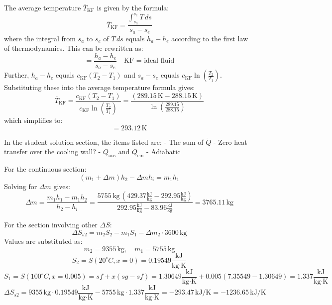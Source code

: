 The average temperature \( \overline{T}_{\text{KF}} \) is given by the formula:
\[
\overline{T}_{\text{KF}} = \frac{\int_{s_a}^{s_e} T \, ds}{s_a - s_e}
\]
where the integral from \( s_a \) to \( s_e \) of \( T \, ds \) equals \( h_a - h_e \) according to the first law of thermodynamics. This can be rewritten as:
\[
= \frac{h_a - h_e}{s_a - s_e} \quad \text{KF = ideal fluid}
\]
Further, \( h_a - h_e \) equals \( c_{\text{KF}} (T_2 - T_1) \) and \( s_a - s_e \) equals \( c_{\text{KF}} \ln \left( \frac{T_2}{T_1} \right) \). Substituting these into the average temperature formula gives:
\[
\overline{T}_{\text{KF}} = \frac{c_{\text{KF}} (T_2 - T_1)}{c_{\text{KF}} \ln \left( \frac{T_2}{T_1} \right)} = \frac{(289.15 \, \text{K} - 288.15 \, \text{K})}{\ln \left( \frac{289.15}{288.15} \right)}
\]
which simplifies to:
\[
= 293.12 \, \text{K}
\]

In the student solution section, the items listed are:
- The sum of \( \dot{Q} \)
- Zero heat transfer over the cooling wall?
- \( \dot{Q}_{\text{aus}} \) and \( \dot{Q}_{\text{ein}} \)
- Adiabatic

For the continuous section:
\[
(m_1 + \Delta m) h_2 - \Delta m h_i = m_1 h_1
\]
Solving for \( \Delta m \) gives:
\[
\Delta m = \frac{m_1 h_1 - m_1 h_2}{h_2 - h_i} = \frac{5755 \, \text{kg} \, (429.37 \frac{\text{kJ}}{\text{kg}} - 292.95 \frac{\text{kJ}}{\text{kg}})}{292.95 \frac{\text{kJ}}{\text{kg}} - 83.96 \frac{\text{kJ}}{\text{kg}}} = 3765.11 \, \text{kg}
\]

For the section involving other \( \Delta S \):
\[
\Delta S_{s2} = m_2 S_2 - m_1 S_1 - \Delta m_2 \cdot 3600 \, \text{kg}
\]
Values are substituted as:
\[
m_2 = 9355 \, \text{kg}, \quad m_1 = 5755 \, \text{kg}
\]
\[
S_2 = S(20^\circ C, x=0) = 0.19549 \frac{\text{kJ}}{\text{kg} \cdot \text{K}}
\]
\[
S_1 = S(100^\circ C, x=0.005) = sf + x (sg - sf) = 1.30649 \frac{\text{kJ}}{\text{kg} \cdot \text{K}} + 0.005 (7.35549 - 1.30649) = 1.337 \frac{\text{kJ}}{\text{kg} \cdot \text{K}}
\]
\[
\Delta S_{s2} = 9355 \, \text{kg} \cdot 0.19549 \frac{\text{kJ}}{\text{kg} \cdot \text{K}} - 5755 \, \text{kg} \cdot 1.337 \frac{\text{kJ}}{\text{kg} \cdot \text{K}} = -293.47 \, \text{kJ/K} = -1236.65 \, \text{kJ/K}
\]